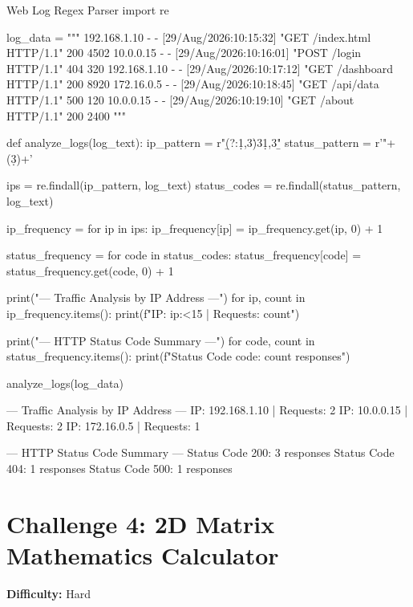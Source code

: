 \begin{pythoncode}{Web Log Regex Parser}
import re

log_data = """
192.168.1.10 - - [29/Aug/2026:10:15:32] "GET /index.html HTTP/1.1" 200 4502
10.0.0.15 - - [29/Aug/2026:10:16:01] "POST /login HTTP/1.1" 404 320
192.168.1.10 - - [29/Aug/2026:10:17:12] "GET /dashboard HTTP/1.1" 200 8920
172.16.0.5 - - [29/Aug/2026:10:18:45] "GET /api/data HTTP/1.1" 500 120
10.0.0.15 - - [29/Aug/2026:10:19:10] "GET /about HTTP/1.1" 200 2400
"""

def analyze_logs(log_text):
    ip_pattern = r"\b(?:\d{1,3}\.){3}\d{1,3}\b"
    status_pattern = r'"\s+(\d{3})\s+'
    
    ips = re.findall(ip_pattern, log_text)
    status_codes = re.findall(status_pattern, log_text)
    
    ip_frequency = {}
    for ip in ips:
        ip_frequency[ip] = ip_frequency.get(ip, 0) + 1
        
    status_frequency = {}
    for code in status_codes:
        status_frequency[code] = status_frequency.get(code, 0) + 1
        
    print("--- Traffic Analysis by IP Address ---")
    for ip, count in ip_frequency.items():
        print(f"IP: {ip:<15} | Requests: {count}")
        
    print("\n--- HTTP Status Code Summary ---")
    for code, count in status_frequency.items():
        print(f"Status Code {code}: {count} responses")

analyze_logs(log_data)
\end{pythoncode}

\begin{outputbox}
--- Traffic Analysis by IP Address ---
IP: 192.168.1.10    | Requests: 2
IP: 10.0.0.15       | Requests: 2
IP: 172.16.0.5      | Requests: 1

--- HTTP Status Code Summary ---
Status Code 200: 3 responses
Status Code 404: 1 responses
Status Code 500: 1 responses
\end{outputbox}

\section{Challenge 4: 2D Matrix Mathematics Calculator}

\textbf{Difficulty:} Hard

